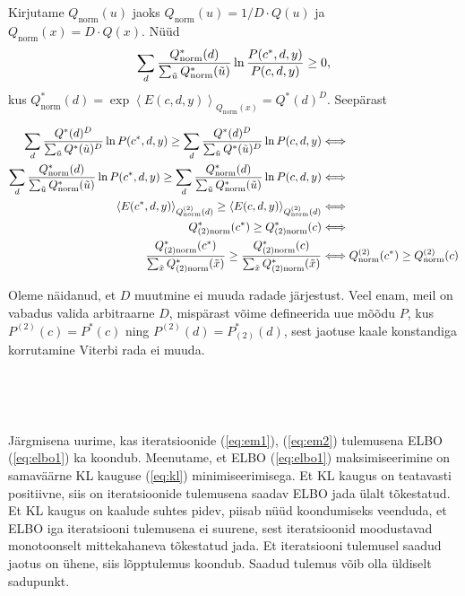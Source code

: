 Kirjutame $Q_{\text{norm}}(u)$ jaoks $Q_{\text{norm}}(u) = 1/D \cdot Q(u)$ ja $Q_{\text{norm}}(x) = D \cdot Q(x)$. Nüüd
$$
\sum_{d} \frac{Q_{\text{norm}}^*(d)}{\sum_{\Tilde{u}} Q_{\text{norm}}^*(\Tilde{u})} \ln \frac{P(c^*, d, y)}{P(c, d, y)} \ge 0,
$$
kus $Q_{\text{norm}}^*(d) = \exp \left<E(c,d,y) \right>_{Q_{\text{norm}}(x)} = Q^*(d)^{D}.$ Seepärast

\begin{align*}
    \sum_{d} \frac{Q^*(d)^D}{\sum_{\Tilde{u}} Q^*(\Tilde{u})^D} \ln P(c^*, d, y) \ge \sum_{d} \frac{Q^*(d)^D}{\sum_{\Tilde{u}} Q^*(\Tilde{u})^D} \ln P(c, d, y) &\Longleftrightarrow \\
    \sum_{d} \frac{Q_{\text{norm}}^*(d)}{\sum_{\Tilde{u}} Q_{\text{norm}}^*(\Tilde{u})} \ln P(c^*, d, y) \ge \sum_{d} \frac{Q_{\text{norm}}^*(d)}{\sum_{\Tilde{u}} Q_{\text{norm}}^*(\Tilde{u})} \ln P(c, d, y) &\Longleftrightarrow \\
    \left<E(c^*,d,y) \right>_{Q_{\text{norm}}^{(2)}(d)} \ge \left<E(c,d,y) \right>_{Q_{\text{norm}}^{(2)}(d)} &\Longleftrightarrow \\
    Q^{*}_{(2)\text{norm}}(c^*) \ge Q^{*}_{(2)\text{norm}} (c) &\Longleftrightarrow \\
    \frac{Q^{*}_{(2)\text{norm}}(c^*)}{ \sum_{\Tilde{x}} Q^{*}_{(2)\text{norm}}(\Tilde{x})} \ge \frac{Q^{*}_{(2)\text{norm}}(c)}{\sum_{\Tilde{x}} Q^{*}_{(2)\text{norm}}(\Tilde{x})} &\Longleftrightarrow Q^{(2)}_{\text{norm}}(c^*) \ge Q^{(2)}_{\text{norm}}(c) 
\end{align*}


Oleme näidanud, et $D$ muutmine ei muuda radade järjestust. Veel enam, meil on vabadus valida arbitraarne $D$, mispärast võime defineerida uue mõõdu $P$, kus $P^{(2)}(c) = P^*(c)$ ning $P^{(2)}(d) = P^*_{(2)}(d)$, sest jaotuse kaale konstandiga korrutamine Viterbi rada ei muuda.

\

\

Järgmisena uurime, kas iteratsioonide (\ref{eq:em1}), (\ref{eq:em2}) tulemusena ELBO (\ref{eq:elbo1}) ka koondub. Meenutame, et ELBO (\ref{eq:elbo1}) maksimiseerimine on samaväärne KL kauguse (\ref{eq:kl}) minimiseerimisega. Et KL kaugus on teatavasti positiivne, siis on iteratsioonide tulemusena saadav ELBO jada ülalt tõkestatud. Et KL kaugus on kaalude suhtes pidev, piisab nüüd koondumiseks veenduda, et ELBO iga iteratsiooni tulemusena ei suurene, sest iteratsioonid moodustavad monotoonselt mittekahaneva tõkestatud jada. Et iteratsiooni tulemusel saadud jaotus on ühene, siis lõpptulemus koondub. Saadud tulemus võib olla üldiselt sadupunkt.

\bla